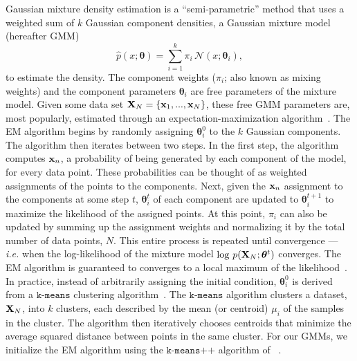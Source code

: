 \documentclass[12pt, letterpaper, preprint]{aastex}
\newcommand{\beq}{\begin{equation}}
\newcommand{\eeq}{\end{equation}}
\newcommand{\gmm}{{\small{GMM}}\xspace}
\newcommand{\gmms}{{\small{GMM}s}\xspace}
\newcommand{\EM}{{\small{EM}}\xspace}
\begin{document}
Gaussian mixture density estimation is a ``semi-parametric'' method 
that uses a weighted sum of $k$ Gaussian component densities, a Gaussian 
mixture model (hereafter \gmm)
\beq
\widehat{p}(x; \bm{\theta}) = \sum\limits_{i=1}^{k} \pi_i\, \mathcal{N}(x; \bm{\theta}_i),
\eeq
to estimate the density. 
The component weights ($\pi_i$; also known as mixing weights) and the 
component parameters $\bm{\theta}_i$ are free parameters of the mixture 
model. Given some data set ${\bf X}_N = \{{\bf x}_1,..., {\bf x}_N \}$, 
these free \gmm parameters are, most popularly, estimated 
through an expectation-maximization algorithm~\citep[\EM;][]{dempster1977, neal1998}.
The \EM algorithm begins by randomly assigning $\bm{\theta}^0_i$ to the 
$k$ Gaussian components. The algorithm then iterates between two steps. 
In the first step, the algorithm computes ${\bf x}_n$, 
a probability of being generated by each component of the model, for every data point. These 
probabilities can be thought of as weighted assignments of the points 
to the components. Next, given the ${\bf x}_n$ assignment to the 
components at some step $t$, $\bm{\theta}^t_i$ of each component are updated to $\bm{\theta}^{t+1}_i$
to maximize the likelihood of the assigned points. At this point, $\pi_i$ 
can also be updated by summing up the assignment weights and 
normalizing it by the total number of data points, $N$. This entire
process is repeated until convergence --- \emph{i.e.} when the log-likelihood of the
mixture model $\log\,p({\bf X}_N; \bm{\theta}^t)$ %
converges. The \EM algorithm is guaranteed to converges to a local maximum 
of the likelihood~\citep{wu1983}. In practice, instead of arbitrarily 
assigning the initial condition, $\bm{\theta}^0_i$ is derived from a $\texttt{k-means}$ 
clustering algorithm~\citep{lloyd1982}. The 
$\texttt{k-means}$ algorithm clusters a dataset, ${\bf X}_N$, into $k$ 
clusters, each described by the mean (or centroid) $\mu_i$ of the
samples in the cluster. The algorithm then iteratively chooses centroids that 
minimize the average squared distance between points in the same cluster.
For our \gmms, we initialize the \EM algorithm using 
the $\texttt{k-means++}$ algorithm of ~\cite{arthur2007}. 

\end{document}
